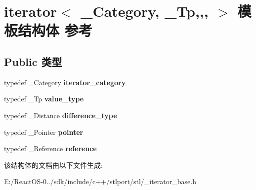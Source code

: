 \hypertarget{structiterator}{}\section{iterator$<$ \+\_\+\+Category, \+\_\+\+Tp,,, $>$ 模板结构体 参考}
\label{structiterator}
\subsection*{Public 类型}
\begin{DoxyCompactItemize}
\item 
\mbox{\label{structiterator_a1c7ca0c37846ddad0a293851da666642}} 
typedef \+\_\+\+Category {\bfseries iterator\+\_\+category}
\item 
\mbox{\label{structiterator_a6012b55b6d738ac133fb043370042dc4}} 
typedef \+\_\+\+Tp {\bfseries value\+\_\+type}
\item 
\mbox{\label{structiterator_ac66cea2a3d059a79c262219b5368a7eb}} 
typedef \+\_\+\+Distance {\bfseries difference\+\_\+type}
\item 
\mbox{\label{structiterator_a55403500fde3d8cd261c4d7ac533c16e}} 
typedef \+\_\+\+Pointer {\bfseries pointer}
\item 
\mbox{\label{structiterator_ae13411380eea076eebbe482fb07c629c}} 
typedef \+\_\+\+Reference {\bfseries reference}
\end{DoxyCompactItemize}


该结构体的文档由以下文件生成\+:\begin{DoxyCompactItemize}
\item 
E\+:/\+React\+O\+S-\/0../sdk/include/c++/stlport/stl/\+\_\+iterator\+\_\+base.\+h\end{DoxyCompactItemize}
